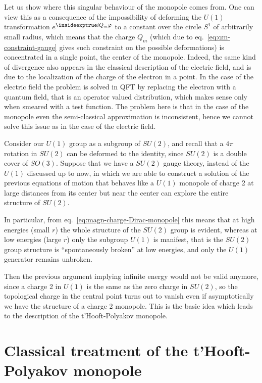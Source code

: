 \documentclass[../main/main.tex]{subfiles}
\begin{document}
Let us show where this singular behaviour of the monopole comes from. One can view this as a consequence of the impossibility of deforming the $U(1)$ transformation $\lexp{iQ_m\varphi}$ to a constant over the circle $S^1$ of arbitrarily small radius, which means that the charge $Q_m$ (which due to eq.~\eqref{eq:qm-constraint-gauge} gives such constraint on the possible deformations) is concentrated in a single point, the center of the monopole. Indeed, the same kind of divergence also appears in the classical description of the electric field, and is due to the localization of the charge of the electron in a point. In the case of the electric field the problem is solved in QFT by replacing the electron with a quantum field, that is an operator valued distribution, which makes sense only when smeared with a test function. 
The problem here is that  in the case of the monopole even the semi-classical approximation is inconsistent, hence we cannot solve this issue as in the case of the electric field. 

\skipline

Consider our $U(1)$ group as a subgroup of $SU(2)$, and recall that a $4\pi$ rotation in $SU(2)$ can be deformed to the identity, since $SU(2)$ is a double cover of $SO(3)$. Suppose that we have a $SU(2)$ gauge theory, instead of the $U(1)$ discussed up to now, in which we are able to construct a solution of the previous equations of motion that behaves like a $U(1)$ monopole of charge 2 at large distances from its center but near the center can explore the entire structure of $SU(2)$. 

In particular, from eq.~\eqref{eq:magn-charge-Dirac-monopole} this means that at high energies (small $r$) the whole structure of the $SU(2)$ group is evident, whereas at low energies (large $r$) only the subgroup $U(1)$ is manifest, that is the $SU(2)$ group structure is ``spontaneously broken'' at low energies, and only the $U(1)$ generator remains unbroken. 

Then the previous argument implying infinite energy would not be valid anymore, since a charge 2 in $U(1)$ is the same as the zero charge in $SU(2)$, so the topological charge in the central point turns out to vanish even if asymptotically we have the structure of a charge 2 monopole. This is the basic idea which leads to the description of the t'Hooft-Polyakov monopole. 

\section{Classical treatment of the t'Hooft-Polyakov monopole}
\end{document}
